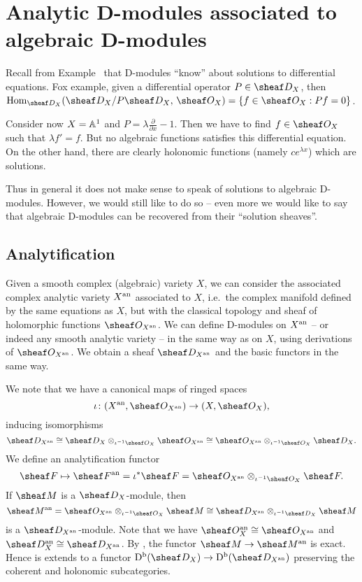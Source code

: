 \documentclass[number-in-sections,a4paper]{notes}
\begin{document}
\section{Analytic D-modules associated to algebraic D-modules}

Recall from Example~\label{ex:sol_fct} that D-modules \enquote{know} about solutions to differential equations.
Fox example, given a differential operator $P \in \sD_X$, then $ \Hom_{\sD_X}(\sD_X/P\sD_X,\, \sO_X) = \{ f \in \sO_X : Pf = 0 \}$.

Consider now $X = \mathbb A^{1}_{}$ and $P = \lambda\frac{\partial}{\partial x} -1$.
Then we have to find $f \in \sO_X$ such that $\lambda f' = f$.
But no algebraic functions satisfies this differential equation.
On the other hand, there are clearly holonomic functions (namely $ce^{\lambda x}$) which are solutions.

Thus in general it does not make sense to speak of solutions to algebraic D-modules.
However, we would still like to do so -- even more we would like to say that algebraic D-modules can be recovered from their \enquote{solution sheaves}.

\subsection{Analytification}

Given a smooth complex (algebraic) variety $X$, we can consider the associated complex analytic variety $X^{\mathrm{an}}$ associated to $X$, i.e.~the complex manifold defined by the same equations as $X$, but with the classical topology and sheaf of holomorphic functions $\sO_{X^\an}$.
We can define D-modules on $X^{\mathrm{an}}$ -- or indeed any smooth analytic variety -- in the same way as on $X$, using derivations of $\sO_{X^\an}$.
We obtain a sheaf $\sD_{X^\an}$ and the basic functors in the same way.

We note that we have a canonical maps of ringed spaces
\[
    \iota\colon (X^\an, \sO_{X^{\an}}) \to (X, \sO_X),
\]
inducing isomorphisms
\[
    \sD_{X^\an} \cong \sD_{X} \otimes_{\iota^{-1}\sO_X} \sO_{X^\an} \cong \sO_{X^\an} \otimes_{\iota^{-1}\sO_X} \sD_{X}.
\]
We define an analytification functor
\[
    \sheaf F \mapsto \sheaf F^\an = \iota^*\sheaf F = \sO_{X^\an} \otimes_{\iota^{-1}\sO_{X}} \sheaf F.
\]
If $\sheaf M$ is a $\sD_X$-module, then
\[
    \sheaf M^\an = 
    \sO_{X^\an} \otimes_{\iota^{-1}\sO_{X}} \sheaf M \cong
    \sD_{X^\an} \otimes_{\iota^{-1}\sD_{X}} \sheaf M
\]
is a $\sD_{X^\an}$-module.
Note that we have $\sO_X^\an \cong \sO_{X^\an}$ and $\sD_X^\an \cong \sD_{X^\an}$.
By \cite[Proposition~10]{Serre:GAGA}, the functor $\sheaf M \to \sheaf M^\an$ is exact.
Hence is extends to a functor $\catDbDMod{X} \to \catDbDMod{X^\an}$ preserving the coherent and holonomic subcategories.
\end{document}
